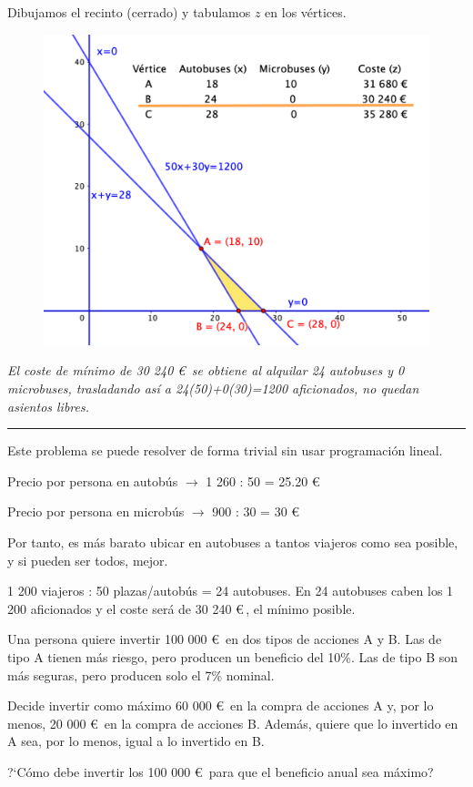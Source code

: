 \vspace{3mm} Dibujamos el recinto (cerrado) y tabulamos $z$ en los vértices.

\begin{figure}[H]
	\centering
	\includegraphics[width=.75\textwidth]{imagenes/img36.png}
\end{figure}

\vspace{3mm} \emph{El coste de mínimo de 30 240 \euro $\, $ se obtiene al alquilar 24 autobuses y 0 microbuses, trasladando así a 24(50)+0(30)=1200 aficionados, no quedan asientos libres.}

\vspace{5mm}
\textcolor{gris}{\rule{200pt}{0.1pt}}
\begin{footnotesize}

\textcolor{gris}{Este problema se puede resolver de forma trivial sin usar programación lineal.}

\textcolor{gris}{Precio por persona en autobús $\to$ 1 260 : 50 = 25.20 \euro}

\textcolor{gris}{Precio por persona en microbús $\to$ 900 : 30 = 30 \euro}

\textcolor{gris}{Por tanto, es más barato ubicar en autobuses a tantos viajeros como sea posible, y si pueden ser todos, mejor.}

\textcolor{gris}{1 200 viajeros : 50 plazas/autobús = 24 autobuses. En 24 autobuses caben los 1 200 aficionados y el coste será de 30 240 \euro$\,$, el mínimo posible.}
\end{footnotesize}


\vspace{10mm}
\begin{ejemplo}
\begin{ejer}
	Una persona quiere invertir 100 000 \euro $\,$ en dos tipos de acciones A y B. Las de tipo A tienen más riesgo, pero producen un beneficio del 10\%. Las de tipo B son más seguras, pero producen solo el 7\% nominal.
	
Decide invertir como máximo 60 000 \euro $\,$ en la compra de acciones A y, por lo menos, 20 000 \euro $\,$ en la compra de acciones B. Además, quiere que lo invertido en A sea, por lo menos, igual a lo invertido en B.

?`Cómo debe invertir los 100 000 \euro $\,$ para que el beneficio anual sea máximo?
\end{ejer}	
\end{ejemplo}
\vspace{5mm}

